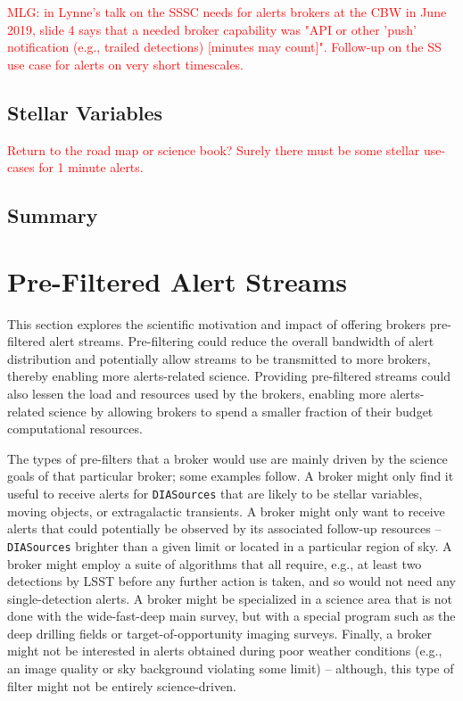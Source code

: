 \documentclass[DM,lsstdraft,authoryear,toc]{lsstdoc}
\begin{document}
\textcolor{red}{MLG: in Lynne's talk on the SSSC needs for alerts brokers at the CBW in June 2019, slide 4 says that a needed broker capability was "API or other 'push' notification (e.g., trailed detections) [minutes may count]". Follow-up on the SS use case for alerts on very short timescales.}


\subsection{Stellar Variables}\label{ssec:latency_stars}

\textcolor{red}{Return to the road map or science book? Surely there must be some stellar use-cases for 1 minute alerts.}


\subsection{Summary}\label{ssec:latency_summary}




\clearpage
\section{Pre-Filtered Alert Streams} \label{sec:prefilter}

This section explores the scientific motivation and impact of offering brokers pre-filtered alert streams. 
Pre-filtering could reduce the overall bandwidth of alert distribution and potentially allow streams to be transmitted to more brokers, thereby enabling more alerts-related science.
Providing pre-filtered streams could also lessen the load and resources used by the brokers, enabling more alerts-related science by allowing brokers to spend a smaller fraction of their budget computational resources.

The types of pre-filters that a broker would use are mainly driven by the science goals of that particular broker; some examples follow.
A broker might only find it useful to receive alerts for {\tt DIASources} that are likely to be stellar variables, moving objects, or extragalactic transients.
A broker might only want to receive alerts that could potentially be observed by its associated follow-up resources -- {\tt DIASources} brighter than a given limit or located in a particular region of sky. 
A broker might employ a suite of algorithms that all require, e.g., at least two detections by LSST before any further action is taken, and so would not need any single-detection alerts.
A broker might be specialized in a science area that is not done with the wide-fast-deep main survey, but with a special program such as the deep drilling fields or target-of-opportunity imaging surveys. 
Finally, a broker might not be interested in alerts obtained during poor weather conditions (e.g., an image quality or sky background violating some limit) -- although, this type of filter might not be entirely science-driven.
\end{document}
